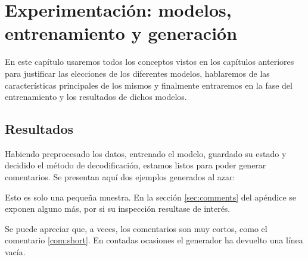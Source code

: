 \chapter{Experimentación: modelos, \\entrenamiento y generación}

En este capítulo usaremos todos los conceptos vistos en los capítulos anteriores para justificar las elecciones de los diferentes modelos, hablaremos de las características principales de los mismos y finalmente entraremos en la fase del entrenamiento y los resultados de dichos modelos.








\section{Resultados}

Habiendo preprocesado los datos, entrenado el modelo, guardado su estado y decidido el método de decodificación, estamos listos para poder generar comentarios. Se presentan aquí dos ejemplos generados al azar:

\begin{thm}
\end{thm}
\begin{thm}
\end{thm}

Esto es solo una pequeña muestra. En la sección \ref{sec:comments} del apéndice se exponen alguno más, por si su inspección resultase de interés. 

Se puede apreciar que, a veces, los comentarios son muy cortos, como el comentario \ref{com:short}. En contadas ocasiones el generador ha devuelto una línea vacía. 

